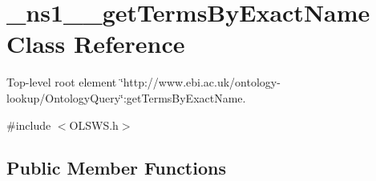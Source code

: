 \hypertarget{class__ns1____getTermsByExactName}{
\section{\_\-ns1\_\-\_\-getTermsByExactName Class Reference}
\label{class__ns1____getTermsByExactName}
}


Top-\/level root element \char`\"{}http://www.ebi.ac.uk/ontology-\/lookup/OntologyQuery\char`\"{}:getTermsByExactName.  




{\ttfamily \#include $<$OLSWS.h$>$}

\subsection*{Public Member Functions}
